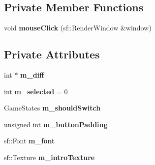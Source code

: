 \subsection*{Private Member Functions}
\begin{DoxyCompactItemize}
\item 
void {\bfseries mouse\+Click} (sf\+::\+Render\+Window \&window)\hypertarget{classDifficulty__Singleplayer__State_a9c25ab4675b3af15ab3077e9c757e1e1}{}\label{classDifficulty__Singleplayer__State_a9c25ab4675b3af15ab3077e9c757e1e1}

\end{DoxyCompactItemize}
\subsection*{Private Attributes}
\begin{DoxyCompactItemize}
\item 
int $\ast$ {\bfseries m\+\_\+diff}\hypertarget{classDifficulty__Singleplayer__State_a1c47bdacc47cc3792f546f2a97a0e61c}{}\label{classDifficulty__Singleplayer__State_a1c47bdacc47cc3792f546f2a97a0e61c}

\item 
int {\bfseries m\+\_\+selected} = 0\hypertarget{classDifficulty__Singleplayer__State_ad4104e51d5fa96ad87a2138361e454b7}{}\label{classDifficulty__Singleplayer__State_ad4104e51d5fa96ad87a2138361e454b7}

\item 
Game\+States {\bfseries m\+\_\+should\+Switch}\hypertarget{classDifficulty__Singleplayer__State_ade8dbb222808f8833faf51f00dedcc6a}{}\label{classDifficulty__Singleplayer__State_ade8dbb222808f8833faf51f00dedcc6a}

\item 
unsigned int {\bfseries m\+\_\+button\+Padding}\hypertarget{classDifficulty__Singleplayer__State_ad22ff49ccf8637fdece38e802964ec19}{}\label{classDifficulty__Singleplayer__State_ad22ff49ccf8637fdece38e802964ec19}

\item 
sf\+::\+Font {\bfseries m\+\_\+font}\hypertarget{classDifficulty__Singleplayer__State_a5fe067706b5c94d0ab16bf60ac8cf7d7}{}\label{classDifficulty__Singleplayer__State_a5fe067706b5c94d0ab16bf60ac8cf7d7}

\item 
sf\+::\+Texture {\bfseries m\+\_\+intro\+Texture}\hypertarget{classDifficulty__Singleplayer__State_a50b5cb9364fddc011f944574d6215bd0}{}\label{classDifficulty__Singleplayer__State_a50b5cb9364fddc011f944574d6215bd0}


\end{DoxyCompactItemize}
